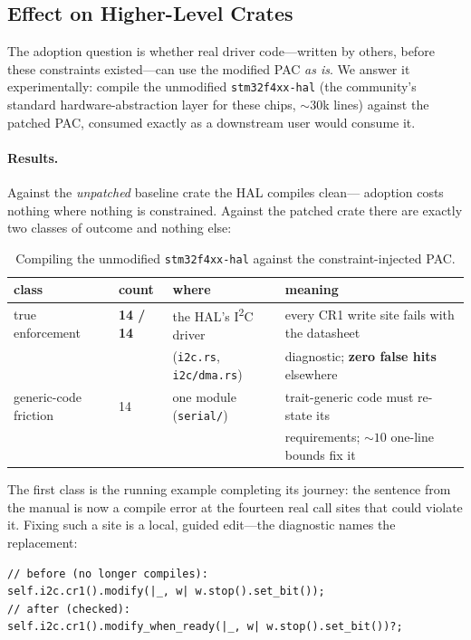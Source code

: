 \subsection{Effect on Higher-Level Crates}
\label{sec:enforcement:hal}

The adoption question is whether real driver code---written by others,
before these constraints existed---can use the modified PAC \emph{as is}. We
answer it experimentally: compile the unmodified \texttt{stm32f4xx-hal} (the
community's standard hardware-abstraction layer for these chips, ${\sim}30$k
lines) against the patched PAC, consumed exactly as a downstream user would
consume it.

\paragraph{Results.}
Against the \emph{unpatched} baseline crate the HAL compiles clean---%
adoption costs nothing where nothing is constrained. Against the patched
crate there are exactly two classes of outcome and nothing else:

\begin{table}[h]
\centering
\small
\begin{tabular}{@{}llll@{}}
\toprule
class & count & where & meaning \\
\midrule
true enforcement & \textbf{14 / 14} & the HAL's I\textsuperscript{2}C driver &
  every CR1 write site fails with the datasheet \\
 & & (\texttt{i2c.rs}, \texttt{i2c/dma.rs}) &
  diagnostic; \textbf{zero false hits} elsewhere \\
\addlinespace
generic-code friction & 14 & one module (\texttt{serial/}) &
  trait-generic code must re-state its \\
 & & & requirements; ${\sim}10$ one-line bounds fix it \\
\bottomrule
\end{tabular}
\caption{Compiling the unmodified \texttt{stm32f4xx-hal} against the
constraint-injected PAC.}
\label{tab:hal-demo}
\end{table}

The first class is the running example completing its journey: the sentence
from the manual is now a compile error at the fourteen real call sites that
could violate it. Fixing such a site is a local, guided edit---the
diagnostic names the replacement:

\begin{lstlisting}
// before (no longer compiles):
self.i2c.cr1().modify(|_, w| w.stop().set_bit());
// after (checked):
self.i2c.cr1().modify_when_ready(|_, w| w.stop().set_bit())?;
\end{lstlisting}

